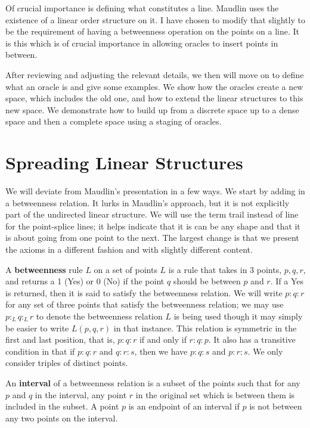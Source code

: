 \documentclass[12pt]{article}
\begin{document}
Of crucial importance is defining what constitutes a line. Maudlin uses the existence of a linear order structure on it. I have chosen to  modify that slightly to be the requirement of having a betweenness operation on the points on a line. It is this which is of crucial importance in allowing oracles to insert points in between. 

After reviewing and adjusting the relevant details, we then will move on to define what an oracle is and give some examples. We show how the oracles create a new space, which includes the old one, and how to extend the linear structures to this new space. We demonstrate how to build up from a discrete space up to a dense space and then a complete space using a staging of oracles. 

\section{Spreading Linear Structures}

We will deviate from Maudlin's presentation in a few ways. We start by adding in a betweenness relation. It lurks in Maudlin's approach, but it is not explicitly part of the undirected linear structure. We will use the term trail instead of line for the point-splice lines; it helps indicate that it is can be any shape and that it is about going from one point to the next. The largest change is that we present the axioms in a different fashion and with slightly different content. 

A \textbf{betweenness} rule $L$ on a set of points $L$ is a rule that takes in 3 points, $p, q, r$, and returns a 1 (Yes) or 0 (No) if the point $q$ should be between $p$ and $r$. If a Yes is returned, then it is said to satisfy the betweenness relation. We will write $p:q:r$ for any set of three points that satisfy the betweenness relation; we may use $p:_L q:_L r$ to denote the betweenness relation $L$ is being used though it may simply be easier to write $L(p,q,r)$ in that instance. This relation is symmetric in the first and last position, that is,  $p:q:r$ if and only if $r:q:p$.  It also has a transitive condition in that if $p:q:r$ and $q:r:s$, then we have $p:q:s$ and $p:r:s$. We only consider triples of distinct points. 

An \textbf{interval} of a betweenness relation is a subset of the points such that for any $p$ and $q$ in the interval, any point $r$ in the original set which is between them is included in the subset.  A point $p$ is an endpoint of an interval if $p$ is not between any two points on the interval.
\end{document}
